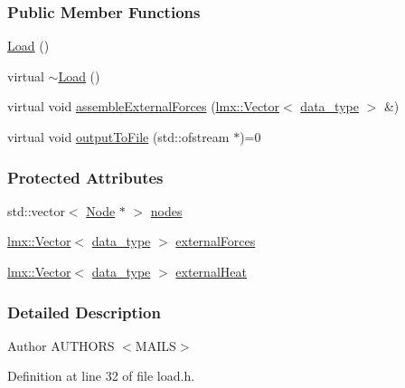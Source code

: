 \subsubsection*{Public Member Functions}
\begin{DoxyCompactItemize}
\item 
\hyperlink{classmknix_1_1_load_a12f3697ad50880cb92bfc7267cca6a1c}{Load} ()
\item 
virtual \hyperlink{classmknix_1_1_load_a79f63ce975fa0c0ad2d9cd8269908b8f}{$\sim$\+Load} ()
\item 
virtual void \hyperlink{classmknix_1_1_load_a93aeafe41cb8ea7c97ae20b5870c5c9e}{assemble\+External\+Forces} (\hyperlink{classlmx_1_1_vector}{lmx\+::\+Vector}$<$ \hyperlink{namespacemknix_a16be4b246fbf2cceb141e3a179111020}{data\+\_\+type} $>$ \&)
\item 
virtual void \hyperlink{classmknix_1_1_load_ada30463dd508345b27de70e3c470745c}{output\+To\+File} (std\+::ofstream $\ast$)=0
\end{DoxyCompactItemize}
\subsubsection*{Protected Attributes}
\begin{DoxyCompactItemize}
\item 
std\+::vector$<$ \hyperlink{classmknix_1_1_node}{Node} $\ast$ $>$ \hyperlink{classmknix_1_1_load_a0cff22a8b9f289b38d978546160b6bb6}{nodes}
\item 
\hyperlink{classlmx_1_1_vector}{lmx\+::\+Vector}$<$ \hyperlink{namespacemknix_a16be4b246fbf2cceb141e3a179111020}{data\+\_\+type} $>$ \hyperlink{classmknix_1_1_load_afbf0c36d2962e6bd85812ef7d498d314}{external\+Forces}
\item 
\hyperlink{classlmx_1_1_vector}{lmx\+::\+Vector}$<$ \hyperlink{namespacemknix_a16be4b246fbf2cceb141e3a179111020}{data\+\_\+type} $>$ \hyperlink{classmknix_1_1_load_a6ef73045639703aac7cdebe3fedcc513}{external\+Heat}
\end{DoxyCompactItemize}


\subsubsection{Detailed Description}
\begin{DoxyAuthor}{Author}
A\+U\+T\+H\+O\+R\+S $<$\+M\+A\+I\+L\+S$>$ 
\end{DoxyAuthor}


Definition at line 32 of file load.\+h.



